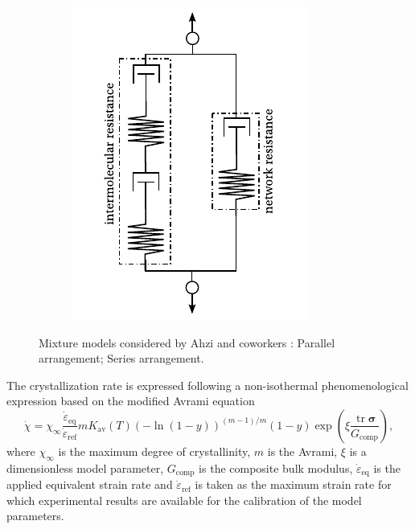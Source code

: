 \begin{figure}[hbtp]
\begin{subfigure}[b]{0.45\textwidth}
						\includegraphics[width=\textwidth]{figures/ahzi_series}
						\caption{}
						\label{subfig:ahzi_series}
		\end{subfigure}
	\caption{Mixture models considered by Ahzi and coworkers \citep{ahziModelingDeformationBehavior2003}:  Parallel arrangement;  Series arrangement.}
\label{fig:ahzi_combiniations}
\end{figure}
The crystallization rate is expressed following a non-isothermal phenomenological expression based on the modiﬁed Avrami equation
\begin{equation}
  \label{eq:rate_eq_cryst}
	\dot \chi = \chi_\infty \frac{\dot\varepsilon_\text{eq}}{\dot\varepsilon_\text{ref} } m K_\text{av}(T) (-\ln(1-y))^{(m-1)/m} (1-y)\exp\left(\xi\frac{\operatorname{tr} \bm \sigma}{G_\text{comp}}\right),
\end{equation}
where $\chi_\infty$ is the maximum degree of crystallinity, $m$ is the Avrami, $\xi$ is a dimensionless model parameter, $G_\text{comp}$ is the composite bulk modulus, $\dot \varepsilon_\text{eq}$ is the applied equivalent strain rate and $\dot\varepsilon_\text{ref}$ is taken as the maximum strain rate for which experimental results are available for the calibration of the model parameters.
